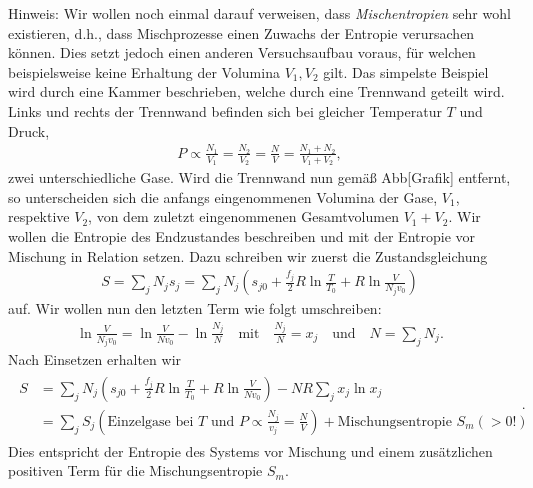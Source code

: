 Hinweis: Wir wollen noch einmal darauf verweisen, dass \emph{Mischentropien} sehr wohl existieren, d.h., dass Mischprozesse einen Zuwachs der Entropie verursachen können. Dies setzt jedoch einen anderen Versuchsaufbau voraus, für welchen beispielsweise keine Erhaltung der Volumina $V_1,V_2$ gilt. Das simpelste Beispiel wird durch eine Kammer beschrieben, welche durch eine Trennwand geteilt wird. Links und rechts der Trennwand befinden sich bei gleicher Temperatur $T$ und Druck, 
\begin{align*}
    P\propto\frac{N_1}{V_1}=\frac{N_2}{V_2}=\frac{N}{V}=\frac{N_1+N_2}{V_1+V_2},
\end{align*}
zwei unterschiedliche Gase. Wird die Trennwand nun gemäß Abb[Grafik] entfernt, so unterscheiden sich die anfangs eingenommenen Volumina der Gase, $V_1$, respektive $V_2$, von dem zuletzt eingenommenen Gesamtvolumen $V_1+V_2$. 
Wir wollen die Entropie des Endzustandes beschreiben und mit der Entropie vor Mischung in Relation setzen. Dazu schreiben wir zuerst die Zustandsgleichung 
\begin{align*}
    S=\sum_jN_js_j=\sum_jN_j\left(s_{j0}+\frac{f_j}{2}R\ln\frac{T}{T_0}+R\ln\frac{V}{N_jv_0}\right)
\end{align*}
auf. Wir wollen nun den letzten Term wie folgt umschreiben: 
\begin{align*}
    \ln\frac{V}{N_jv_0}=\ln\frac{V}{Nv_0}-\ln\frac{N_j}{N}\quad\text{mit}\quad\frac{N_j}{N}=x_j\quad\text{und}\quad N=\sum_jN_j.
\end{align*}
Nach Einsetzen erhalten wir 
\begin{align*}
    \boxed{
    \begin{aligned}
        S&=\sum_jN_j\left(s_{j0}+\frac{f_j}{2}R\ln\frac{T}{T_0}+R\ln\frac{V}{Nv_0}\right)-NR\sum_jx_j\ln x_j\\
        &=\sum_jS_j(\text{Einzelgase bei $T$ und }P\propto \frac{N_j}{v_j}=\frac{N}{V})+\text{Mischungsentropie $S_m(>0!)$}
    \end{aligned}
    }\:.
\end{align*}
Dies entspricht der Entropie des Systems vor Mischung und einem zusätzlichen positiven Term für die Mischungsentropie $S_m$.
